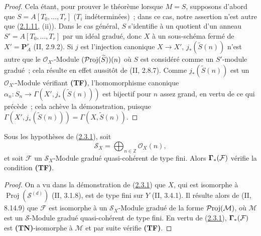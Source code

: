 \begin{proof}
Cela étant, pour prouver le théorème lorsque $M=S$, supposons d'abord que
$S=A[T_0,\ldots,T_r]$ ($T_i$ indéterminées)~; dans ce cas, notre assertion
n'est autre que (\hyperref[III.2.1.11-fr]{2.1.11}, (ii)). Dans le cas
général, $S$ s'identifie à un quotient d'un anneau
$S'=A[T_0,\ldots,T_r]$ par un idéal gradué, donc $X$ à un sous-schéma
fermé de $X'=\mathbf P_A^r$ (II, 2.9.2). Si $j$ est l'injection canonique
$X\to X'$, $j_*(\widetilde S(n))$ n'est autre que le
$\mathcal O_{X'}$-Module $(\mathcal{P}\mathrm{roj}(\widetilde S))(n)$ où $S$ est considéré
comme un $S'$-module gradué~; cela résulte en effet aussitôt de
(II, 2.8.7). Comme $j_*(\widetilde S(n))$ est un
$\mathcal O_{X'}$-Module vérifiant \textbf{(TF)}, l'homomorphisme canonique
$\alpha_n:S_n\to\Gamma(X',j_*(\widetilde S(n)))$ est bijectif pour $n$
assez grand, en vertu de ce qui précède~; cela achève la démonstration,
puisque
$\Gamma(X',j_*(\widetilde S(n)))=\Gamma(X,\widetilde S(n))$.
\end{proof}

\begin{corollary}[2.3.2]
\label{III.2.3.2-fr}
Sous les hypothèses de (\hyperref[III.2.3.1-fr]{2.3.1}), soit
\[
\mathcal S_X=\bigoplus_{n\in\mathbb Z}\mathcal O_X(n),
\]
et soit $\mathcal F$ un $\mathcal S_X$-Module gradué quasi-cohérent de
type fini. Alors $\boldsymbol{\Gamma}_*(\mathcal F)$ vérifie la condition
\textbf{(TF)}.
\end{corollary}

\begin{proof}
On a vu dans la démonstration de
(\hyperref[III.2.3.1-fr]{2.3.1}) que $X$, qui est isomorphe à
$\operatorname{Proj}(\mathcal S^{(d)})$ (II, 3.1.8), est de type fini sur
$Y$ (II, 3.4.1). Il résulte alors de (II, 8.14.9) que $\mathcal F$ est
isomorphe à un $\mathcal S_X$-Module gradué de la forme
$\mathcal{P}\mathrm{roj}(\mathcal M)$, où $\mathcal M$ est un $\mathcal S$-Module gradué
quasi-cohérent de type fini. En vertu de
(\hyperref[III.2.3.1-fr]{2.3.1}), $\boldsymbol{\Gamma}_*(\mathcal F)$ est
\textbf{(TN)}-isomorphe à $\mathcal M$ et par suite vérifie
\textbf{(TF)}.
\end{proof}

